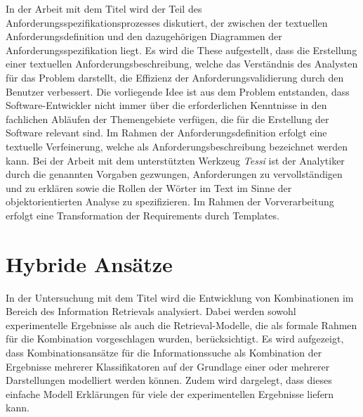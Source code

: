 In der Arbeit mit dem Titel \cite{kroha2000preprocessing} wird der Teil des Anforderungsspezifikationsprozesses diskutiert, der zwischen der textuellen Anforderungsdefinition und den dazugehörigen Diagrammen der Anforderungsspezifikation liegt. Es wird die These aufgestellt, dass die Erstellung einer textuellen Anforderungsbeschreibung, welche das Verständnis des Analysten für das Problem darstellt, die Effizienz der Anforderungsvalidierung durch den Benutzer verbessert. Die vorliegende Idee ist aus dem Problem entstanden, dass Software-Entwickler nicht immer über die erforderlichen Kenntnisse in den fachlichen Abläufen der Themengebiete verfügen, die für die Erstellung der Software relevant sind. Im Rahmen der Anforderungsdefinition erfolgt eine textuelle Verfeinerung, welche als Anforderungsbeschreibung bezeichnet werden kann. Bei der Arbeit mit dem unterstützten Werkzeug \emph{Tessi} ist der Analytiker durch die genannten Vorgaben gezwungen, Anforderungen zu vervollständigen und zu erklären sowie die Rollen der Wörter im Text im Sinne der objektorientierten Analyse zu spezifizieren. Im Rahmen der Vorverarbeitung erfolgt eine Transformation der Requirements durch Templates.

\section{Hybride Ansätze}
In der Untersuchung mit dem Titel \cite{croft2000combining} wird die Entwicklung von Kombinationen im Bereich des Information Retrievals analysiert. Dabei werden sowohl experimentelle Ergebnisse als auch die Retrieval-Modelle, die als formale Rahmen für die Kombination vorgeschlagen wurden, berücksichtigt. Es wird aufgezeigt, dass Kombinationsansätze für die Informationssuche als Kombination der Ergebnisse mehrerer Klassifikatoren auf der Grundlage einer oder mehrerer Darstellungen modelliert werden können. Zudem wird dargelegt, dass dieses einfache Modell Erklärungen für viele der experimentellen Ergebnisse liefern kann.\\

